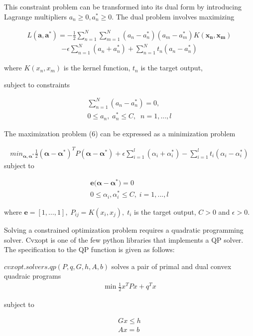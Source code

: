 \documentclass[12pt]{article}
\begin{document}
This constraint problem can be transformed into its dual form  by introducing Lagrange multipliers 
\(a_n \geq 0, a_n^* \geq 0\).
The dual problem involves maximizing

\begin{gather}
  L(\mathbf{a},\mathbf{a^*}) = -\frac{1}{2}\sum_{n=1}^{N}\sum_{m=1}^{N}(a_n-a_n^*)(a_m-a_m^*)K(\mathbf{x_n},\mathbf{x_m})
\end{gather}
\begin{gather*}
  -\epsilon\sum_{n=1}^{N}(a_n+a_n^*) + \sum_{n=1}^{N}t_n(a_n-a_n^*)
 \end{gather*}

where \(K(x_n,x_m) \) is the kernel function, \(t_n\) is the target output,

subject to constraints

\begin{gather}
  \sum_{n=1}^{N}(a_n-a_n^*)=0,\\
  0\leq a_n,\; a_n^*\leq C,\;\;    n=1,...,l 
\end{gather}


The maximization problem (6) can be expressed as a minimization problem

\begin{gather}
  min_{\bm{\alpha},\bm{\alpha^*}} \frac{1}{2}(\bm{\alpha-\alpha^*})^T P (\bm{\alpha - \alpha^*})+\epsilon 
\sum_{i=1}^{l}(\alpha_i+\alpha_i^*)-\sum_{i=1}^{l}t_i(\alpha_i-\alpha_i^*)
\end{gather}
subject to

\begin{gather}
  \mathbf{e(\bm{\alpha}}-\bm{\alpha^*})=0 \\
  0\leq \alpha_i,\alpha_i^* \leq C, \;i=1,...,l
 \end{gather}

where
\(\mathbf{e}=[1,...,1],\;P_{ij}=K(x_i,x_j),\;t_i\) is the target output, \(C > 0\) and \(\epsilon > 0.\)

Solving a constrained optimization problem requires a quadratic programming solver. Cvxopt is one of the few python
libraries that implements a QP solver. The specification to the QP function is given as follows:

\(cvxopt.solvers.qp(P,q,G,h,A,b)\) solves a pair of primal and dual convex quadraic programs
\begin{gather}
  \min \frac{1}{2} x^T P x + q^T x
\end{gather}

 subject to

\begin{gather}
 G x \leq h\\
  Ax = b
\end{gather}
\end{document}
